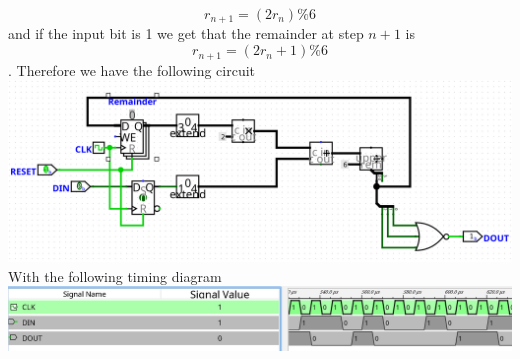 \documentclass[12pt]{article}
\begin{document}
$$r_{n+1}=(2r_n)\% 6$$ and if the input bit is 1 we get that the remainder at step $n+1$ is $$r_{n+1}=(2r_n+1)\%6$$.
Therefore we have the following circuit
\\\includegraphics[scale=0.25]{Q6.png}
With the following timing diagram
\\\includegraphics[scale=0.3]{Q6timing.png}
\end{document}
